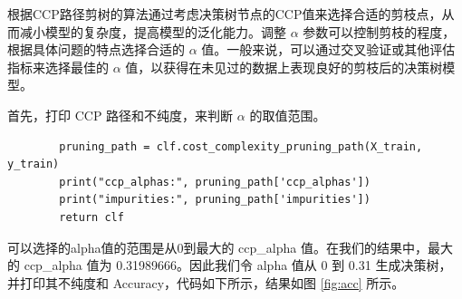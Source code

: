 \documentclass[a4paper,12pt,onecolumn,oneside]{article}
\begin{document}
	根据CCP路径剪树的算法通过考虑决策树节点的CCP值来选择合适的剪枝点，从而减小模型的复杂度，提高模型的泛化能力。调整 $\alpha$ 参数可以控制剪枝的程度，根据具体问题的特点选择合适的 $\alpha$ 值。一般来说，可以通过交叉验证或其他评估指标来选择最佳的 $\alpha$ 值，以获得在未见过的数据上表现良好的剪枝后的决策树模型。
	
	首先，打印 CCP 路径和不纯度，来判断 $\alpha$ 的取值范围。
	
	\lstset{language=Python}
	\lstset{frame=lines}
	\lstset{basicstyle=\footnotesize}
	\begin{lstlisting}
		pruning_path = clf.cost_complexity_pruning_path(X_train, y_train)
		print("ccp_alphas:", pruning_path['ccp_alphas'])
		print("impurities:", pruning_path['impurities'])
		return clf
	\end{lstlisting}
	
	可以选择的alpha值的范围是从0到最大的 ccp\_alpha 值。在我们的结果中，最大的 ccp\_alpha 值为 0.31989666。因此我们令 alpha 值从 0 到 0.31 生成决策树，并打印其不纯度和 Accuracy，代码如下所示，结果如图 \ref{fig:acc} 所示。
	
\end{document}
